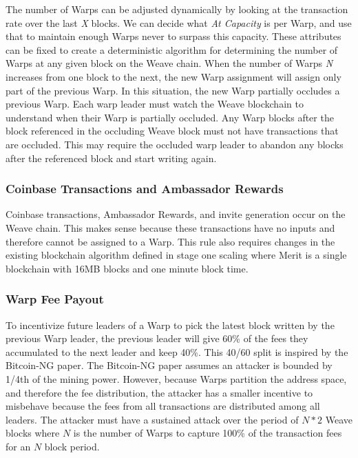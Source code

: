 \documentclass{article}
\begin{document}
The number of Warps can be adjusted dynamically by looking at the transaction
rate over the last \emph{X} blocks.  We can decide what \emph{At Capacity} is per
Warp, and use that to maintain enough Warps never to surpass this capacity.  These
attributes can be fixed to create a deterministic algorithm for determining the
number of Warps at any given block on the Weave chain.  When the number of Warps 
\emph{N} increases from one block to the next, the new Warp assignment will assign
only part of the previous Warp.  In this situation, the new Warp partially occludes
a previous Warp.  Each warp leader must watch the Weave blockchain to understand 
when their Warp is partially occluded.  Any Warp blocks after the block referenced
in the occluding Weave block must not have transactions that are occluded.  This
may require the occluded warp leader to abandon any blocks after the referenced
block and start writing again.

\subsubsection{Coinbase Transactions and Ambassador Rewards}

Coinbase transactions, Ambassador Rewards, and invite generation occur on the
Weave chain.  This makes sense because these transactions have no inputs and
therefore cannot be assigned to a Warp.  This rule also requires changes in the
existing blockchain algorithm defined in stage one scaling where Merit is a single
blockchain with 16MB blocks and one minute block time.

\subsubsection{Warp Fee Payout}

To incentivize future leaders of a Warp to pick the latest block written
by the previous Warp leader, the previous leader will give 60\% of the fees they
accumulated to the next leader and keep 40\%.  This 40/60 split is inspired by
the Bitcoin-NG \cite{bitcoinng} paper.  The Bitcoin-NG paper assumes an attacker
is bounded by 1/4th of the mining power.  However, because Warps partition the
address space, and therefore the fee distribution, the attacker has a smaller
incentive to misbehave because the fees from all transactions are distributed
among all leaders.  The attacker must have a sustained attack over the period of
$N*2$ Weave blocks where $N$ is the number of Warps to capture 100\% of the
transaction fees for an $N$ block period.
\end{document}
